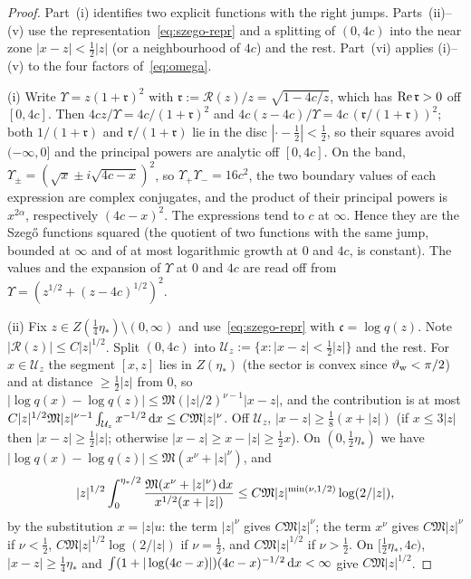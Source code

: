 \begin{proof}
Part~(i) identifies two explicit functions with the right jumps. Parts~(ii)--(v) use the
representation~\eqref{eq:szego-repr} and a splitting of $(0,4c)$ into the near zone $|x-z|<\frac12|z|$ (or a
neighbourhood of $4c$) and the rest. Part~(vi) applies (i)--(v) to the four factors of~\eqref{eq:omega}.

(i) Write $\Upsilon=z(1+\mathfrak r)^2$ with $\mathfrak r:=\mathcal R(z)/z=\sqrt{1-4c/z}$, which has $\operatorname{Re}\mathfrak r>0$ off
$[0,4c]$. Then $4cz/\Upsilon=4c/(1+\mathfrak r)^2$ and $4c(z-4c)/\Upsilon=4c\,(\mathfrak r/(1+\mathfrak r))^2$; both
$1/(1+\mathfrak r)$ and $\mathfrak r/(1+\mathfrak r)$ lie in the disc $|\cdot-\frac12|<\frac12$, so their squares avoid
$(-\infty,0]$ and the principal powers are analytic off $[0,4c]$. On the band, $\Upsilon_\pm=(\sqrt x\pm i\sqrt{4c-x})^2$,
so $\Upsilon_+\Upsilon_-=16c^2$, the two boundary values of each expression are complex conjugates, and the product of
their principal powers is $x^{2\alpha}$, respectively $(4c-x)^2$. The expressions tend to $c$ at $\infty$. Hence they are
the Szeg\H{o} functions squared (the quotient of two functions with the same jump, bounded at $\infty$ and of at most
logarithmic growth at $0$ and $4c$, is constant). The values and the expansion of $\Upsilon$ at $0$ and $4c$ are read off
from $\Upsilon=(z^{1/2}+(z-4c)^{1/2})^2$.

(ii) Fix $z\in Z(\frac14\eta_*)\setminus(0,\infty)$ and use~\eqref{eq:szego-repr} with $\mathfrak c=\log q(z)$. Note
$|\mathcal R(z)|\le C|z|^{1/2}$. Split $(0,4c)$ into $\mathcal U_z:=\{x:|x-z|<\frac12|z|\}$ and the rest. For $x\in\mathcal U_z$
the segment $[x,z]$ lies in $Z(\eta_*)$ (the sector is convex since $\vartheta_{\mathrm{w}}<\pi/2$) and at distance $\ge\frac12|z|$ from $0$,
so $|\log q(x)-\log q(z)|\le\mathfrak M(|z|/2)^{\nu-1}|x-z|$, and the contribution is at most
$C|z|^{1/2}\mathfrak M|z|^{\nu-1}\int_{\mathcal U_z}x^{-1/2}\,\mathrm{d} x\le C\mathfrak M|z|^\nu$. Off $\mathcal U_z$, $|x-z|\ge\frac18(x+|z|)$ (if
$x\le3|z|$ then $|x-z|\ge\frac12|z|$; otherwise $|x-z|\ge x-|z|\ge\frac12x$). On $(0,\frac12\eta_*)$ we have
$|\log q(x)-\log q(z)|\le\mathfrak M(x^\nu+|z|^\nu)$, and
\[
  |z|^{1/2}\int_0^{\eta_*/2}\frac{\mathfrak M(x^\nu+|z|^\nu)\,\mathrm{d} x}{x^{1/2}(x+|z|)}\le C\mathfrak M|z|^{\min(\nu,1/2)}\log(2/|z|),
\]
by the substitution $x=|z|u$: the term $|z|^\nu$ gives $C\mathfrak M|z|^\nu$; the term $x^\nu$ gives $C\mathfrak M|z|^\nu$ if $\nu<\frac12$,
$C\mathfrak M|z|^{1/2}\log(2/|z|)$ if $\nu=\frac12$, and $C\mathfrak M|z|^{1/2}$ if $\nu>\frac12$. On $[\frac12\eta_*,4c)$, $|x-z|\ge\frac14\eta_*$ and
$\int(1+|\log(4c-x)|)(4c-x)^{-1/2}\,\mathrm{d} x<\infty$ give $C\mathfrak M|z|^{1/2}$.


\end{proof}
